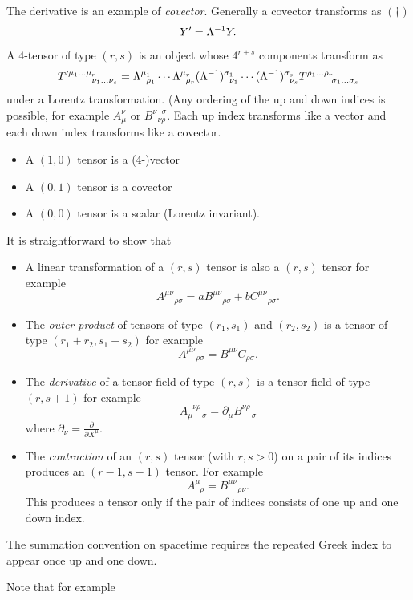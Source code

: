 \documentclass{article}
\newcommand{\glg}{\phantom{\mu}}
\begin{document}
The derivative is an example of \textit{covector}. Generally a covector transforms as $ (\dagger) $
\[
  Y' = {\Lambda}^{-1} Y.
\]
A $ 4 $-tensor of type $ (r,s) $ is an object whose $ 4^{r+s} $ components transform as
\[
	T'^{\mu_1\dots \mu_r}_{\phantom{\mu_1\dots\mu_r} \nu_1\dots \nu_s} = \Lambda^{\mu_1}_{\glg \rho_1}\cdots \Lambda ^{\mu_r}_{\glg \rho_r}(\inv \Lambda)^{\sigma_1}_{\glg \nu_1}\cdots (\inv \Lambda)^{\sigma_s}_{\glg \nu_s} T^{\rho_1\dots \rho_r}_{\phantom{\rho_1\dots\rho_r}\sigma_1\dots \sigma_s}
\]
under a Lorentz transformation. (Any ordering of the up and down indices is possible, for example $ A_\mu^\nu $ or $ B^{\nu \ \ \ \sigma}_{\glg \nu \rho}$. Each up index transforms like a vector and each down index transforms like a covector. 
\begin{itemize}
	\item A $ (1,0) $ tensor is a (4-)vector
	\item A $ (0,1) $ tensor is a covector
	\item A $ (0,0) $ tensor is a scalar (Lorentz invariant).
\end{itemize}
It is straightforward to show that 
\begin{itemize}
	\item A linear transformation of a $ (r,s) $ tensor is also a $ (r,s) $ tensor for example
		\[
			A^{\mu\nu}_{\glg\glg \rho\sigma} = aB^{\mu\nu}_{\glg\glg\rho\sigma}+bC^{\mu\nu}_{\glg\glg\rho\sigma}.
		\]
	\item The \textit{outer product} of tensors of type $ (r_1,s_1) $ and $ (r_2,s_2) $ is a tensor of type $ (r_1+r_2,s_1+s_2) $ for example
		\[
			A^{\mu\nu}_{\glg\glg \rho\sigma} = B^{\mu\nu}C_{\rho\sigma}.
		\]
	\item The \textit{derivative} of a tensor field of type $ (r,s) $ is a tensor field of type $ (r,s+1) $ for example
		\[
			A_{\mu \glg\glg \sigma}^{\glg \nu\rho} = \partial_\mu B^{\nu\rho}_{\glg\glg \sigma}
		\]
		where $ \partial_\nu = \frac{\partial}{\partial X^\mu} $.
	\item The \textit{contraction} of an $ (r,s) $ tensor (with $ r,s>0 $) on a pair of its indices produces an $ (r-1,s-1) $ tensor. For example
		\[
			A^{\mu}_{\glg \rho} = B^{\mu\nu}_{\glg\glg \rho \nu}.
		\]
		This produces a tensor only if the pair of indices consists of one up and one down index.
\end{itemize}
The summation convention on spacetime requires the repeated Greek index to appear once up and one down.\par
Note that for example
\end{document}
